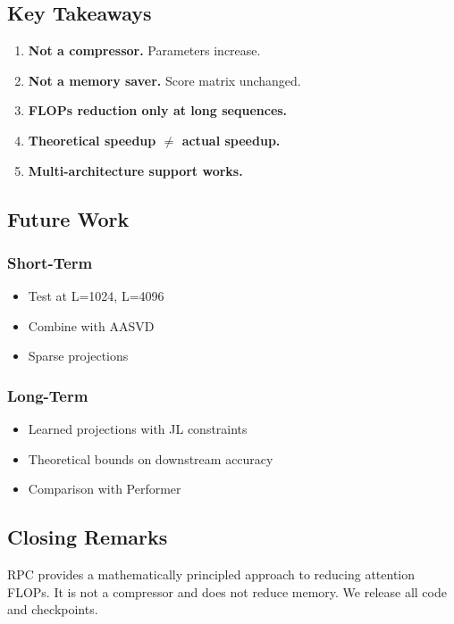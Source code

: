 \subsection{Key Takeaways}

\begin{enumerate}
\item \textbf{Not a compressor.} Parameters increase.
\item \textbf{Not a memory saver.} Score matrix unchanged.
\item \textbf{FLOPs reduction only at long sequences.}
\item \textbf{Theoretical speedup $\ne$ actual speedup.}
\item \textbf{Multi-architecture support works.}

\end{enumerate}
\subsection{Future Work}

\subsubsection{Short-Term}
\begin{itemize}
\item Test at L=1024, L=4096
\item Combine with AASVD
\item Sparse projections

\end{itemize}
\subsubsection{Long-Term}
\begin{itemize}
\item Learned projections with JL constraints
\item Theoretical bounds on downstream accuracy
\item Comparison with Performer

\end{itemize}
\subsection{Closing Remarks}

RPC provides a mathematically principled approach to reducing attention 
FLOPs. It is not a compressor and does not reduce memory. We release all 
code and checkpoints.

